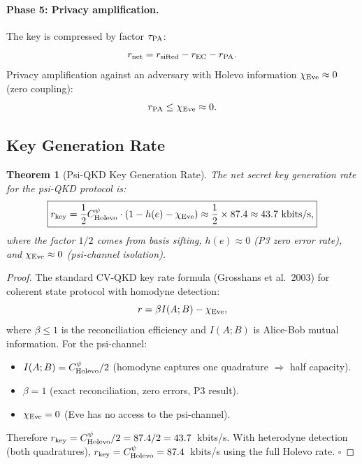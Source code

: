 \documentclass[aps,prd,twocolumn,superscriptaddress,nofootinbib]{revtex4-2}
\newtheorem{theorem}{Theorem}
\begin{document}
\paragraph{Phase 5: Privacy amplification.}
The key is compressed by factor $\tau_{\rm PA}$:
\begin{equation}
r_{\rm net} = r_{\rm sifted} - r_{\rm EC} - r_{\rm PA}.
\end{equation}
Privacy amplification against an adversary with Holevo information
$\chi_{\rm Eve} \approx 0$ (zero coupling):
\begin{equation}
r_{\rm PA} \leq \chi_{\rm Eve} \approx 0.
\end{equation}

\subsection{Key Generation Rate}

\begin{theorem}[Psi-QKD Key Generation Rate]
\label{thm:qkd-rate}
The net secret key generation rate for the psi-QKD protocol is:
\begin{equation}
\boxed{
r_{\rm key} = \frac{1}{2} C_{\rm Holevo}^\psi \cdot (1 - h(e) - \chi_{\rm Eve})
\approx \frac{1}{2} \times 87.4 \approx 43.7~\text{kbits/s},
}
\label{eq:r-key}
\end{equation}
where the factor $1/2$ comes from basis sifting, $h(e) \approx 0$
(P3 zero error rate), and $\chi_{\rm Eve} \approx 0$ (psi-channel isolation).
\end{theorem}

\begin{proof}
The standard CV-QKD key rate formula (Grosshans et al.\ 2003) for coherent
state protocol with homodyne detection:
\begin{equation}
r = \beta I(A;B) - \chi_{\rm Eve},
\label{eq:CV-QKD}
\end{equation}
where $\beta \leq 1$ is the reconciliation efficiency and $I(A;B)$
is Alice-Bob mutual information. For the psi-channel:
\begin{itemize}
\item $I(A;B) = C_{\rm Holevo}^\psi/2$ (homodyne captures one quadrature $\Rightarrow$ half capacity).
\item $\beta = 1$ (exact reconciliation, zero errors, P3 result).
\item $\chi_{\rm Eve} = 0$ (Eve has no access to the psi-channel).
\end{itemize}
Therefore $r_{\rm key} = C_{\rm Holevo}^\psi/2 = 87.4/2 = 43.7$~kbits/s.
With heterodyne detection (both quadratures), $r_{\rm key} = C_{\rm Holevo}^\psi = 87.4$~kbits/s
using the full Holevo rate. $\square$
\end{proof}
\end{document}
